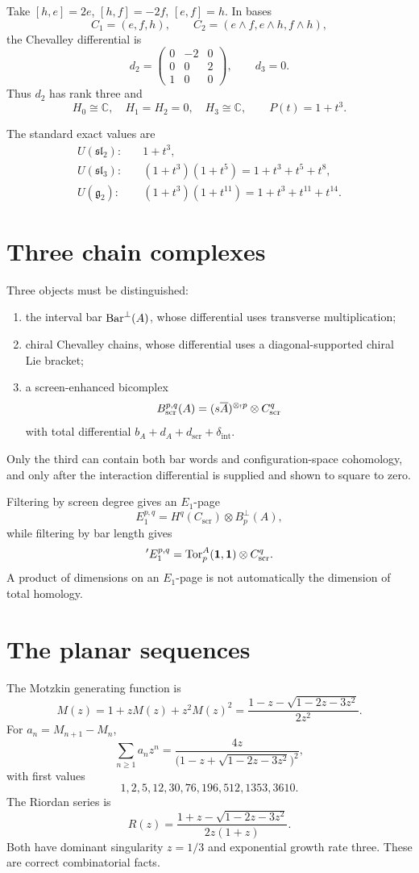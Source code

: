 \begin{calcbox}[title={The \(\mathfrak{sl}_2\) chain matrix}]
Take \([h,e]=2e\), \([h,f]=-2f\), \([e,f]=h\).  In bases
\[
 C_1=(e,f,h),\qquad C_2=(e\wedge f,e\wedge h,f\wedge h),
\]
the Chevalley differential is
\[
 d_2=
 \begin{pmatrix}
 0&-2&0\\
 0&0&2\\
 1&0&0
 \end{pmatrix},
 \qquad d_3=0.
\]
Thus \(d_2\) has rank three and
\[
 H_0\cong\mathbb C,
 \quad H_1=H_2=0,
 \quad H_3\cong\mathbb C,
 \qquad P(t)=1+t^3.
\]
\end{calcbox}

The standard exact values are
\begin{align*}
 U(\mathfrak{sl}_2):&\quad 1+t^3,\\
 U(\mathfrak{sl}_3):&\quad(1+t^3)(1+t^5)=1+t^3+t^5+t^8,\\
 U(\mathfrak g_2):&\quad(1+t^3)(1+t^{11})=1+t^3+t^{11}+t^{14}.
\end{align*}

\section{Three chain complexes}
Three objects must be distinguished:
\begin{enumerate}
\item the interval bar \(\operatorname{Bar}^\perp(A)\), whose differential uses transverse multiplication;
\item chiral Chevalley chains, whose differential uses a diagonal-supported chiral Lie bracket;
\item a screen-enhanced bicomplex
\[
 B^{p,q}_{\mathrm{scr}}(A)=
 (s\overline{A})^{\mathbin{\otimes_{!}} p}\otimes C^q_{\mathrm{scr}}
\]
with total differential \(b_A+d_A+d_{\mathrm{scr}}+\delta_{\mathrm{int}}\).
\end{enumerate}
Only the third can contain both bar words and configuration-space cohomology, and only after the interaction differential is supplied and shown to square to zero.

Filtering by screen degree gives an \(E_1\)-page
\[
 E_1^{p,q}=H^q(C_{\mathrm{scr}})\otimes B_p^\perp(A),
\]
while filtering by bar length gives
\[
 {}'E_1^{p,q}=\operatorname{Tor}_p^A(\mathbf 1,\mathbf 1)\otimes C^q_{\mathrm{scr}}.
\]
A product of dimensions on an \(E_1\)-page is not automatically the dimension of total homology.

\section{The planar sequences}
The Motzkin generating function is
\[
 M(z)=1+zM(z)+z^2M(z)^2
 =\frac{1-z-\sqrt{1-2z-3z^2}}{2z^2}.
\]
For \(a_n=M_{n+1}-M_n\),
\[
 \sum_{n\ge1}a_nz^n
 =\frac{4z}{\bigl(1-z+\sqrt{1-2z-3z^2}\bigr)^2},
\]
with first values
\[
 1,2,5,12,30,76,196,512,1353,3610.
\]
The Riordan series is
\[
 R(z)=\frac{1+z-\sqrt{1-2z-3z^2}}{2z(1+z)}.
\]
Both have dominant singularity \(z=1/3\) and exponential growth rate three.  These are correct combinatorial facts.

